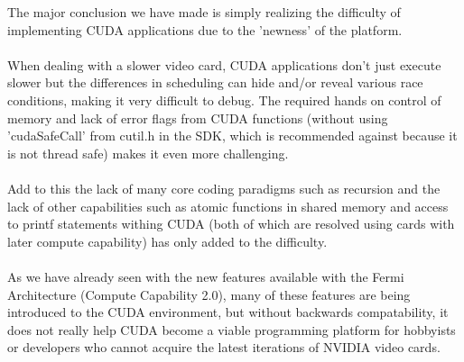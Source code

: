\documentclass{article}
\begin{document}
The major conclusion we have made is simply realizing the difficulty of implementing CUDA applications due to the 'newness' of the platform.\\
\\
When dealing with a slower video card, CUDA applications don't just execute slower but the differences in scheduling can hide and/or reveal various race conditions, making it very difficult to debug. The required hands on control of memory and lack of error flags from CUDA functions (without using 'cudaSafeCall' from cutil.h in the SDK, which is recommended against because it is not thread safe) makes it even more challenging.\\
\\
Add to this the lack of many core coding paradigms such as recursion and the lack of other capabilities such as atomic functions in shared memory and access to printf statements withing CUDA (both of which are resolved using cards with later compute capability) has only added to the difficulty.\\
\\
As we have already seen with the new features available with the Fermi Architecture (Compute Capability 2.0), many of these features are being introduced to the CUDA environment, but without backwards compatability, it does not really help CUDA become a viable programming platform for hobbyists or developers who cannot acquire the latest iterations of NVIDIA video cards.
\end{document}
